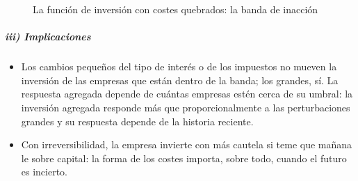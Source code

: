 \documentclass[11pt]{article}
\begin{document}
\begin{figure}[H]
\centering
\caption{La función de inversión con costes quebrados: la banda de inacción}\label{fig:inversion-banda}
\end{figure}

\subparagraph{iii) Implicaciones}

\begin{itemize}
\item Los cambios pequeños del tipo de interés o de los impuestos no mueven la inversión de las empresas que están dentro de la banda; los grandes, sí. La respuesta agregada depende de cuántas empresas estén cerca de su umbral: la inversión agregada responde más que proporcionalmente a las perturbaciones grandes y su respuesta depende de la historia reciente\nocite{CaballeroEngel1999Explaining}.
\item Con irreversibilidad, la empresa invierte con más cautela si teme que mañana le sobre capital: la forma de los costes importa, sobre todo, cuando el futuro es incierto.
\end{itemize}
\end{document}
